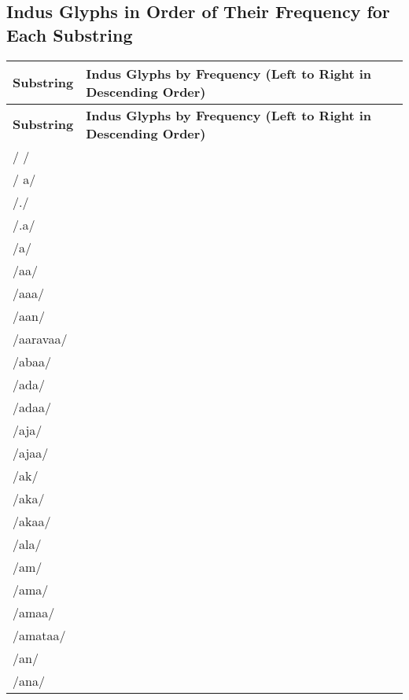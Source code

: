 \documentclass{article}
\begin{document}
\begin{center}
\section*{Indus Glyphs in Order of Their Frequency for Each Substring}
\end{center}
\begin{longtable}{|l|p{}|}
\hline
\textbf{Substring} & \textbf{Indus Glyphs by Frequency (Left to Right in Descending Order)} \\
\hline
\endfirsthead
\hline
\textbf{Substring} & \textbf{Indus Glyphs by Frequency (Left to Right in Descending Order)} \\
\hline
\endhead
\hline
\endfoot
\hline
\endlastfoot
/ / & \textIndus{} \\ \hline
/ a/ & \textIndus{} \\ \hline
/./ & \textIndus{} \\ \hline
/.a/ & \textIndus{} \\ \hline
/a/ & \textIndus{} \\ \hline
/aa/ & \textIndus{} \\ \hline
/aaa/ & \textIndus{} \\ \hline
/aan/ & \textIndus{} \\ \hline
/aaravaa/ & \textIndus{} \\ \hline
/abaa/ & \textIndus{} \\ \hline
/ada/ & \textIndus{} \\ \hline
/adaa/ & \textIndus{} \\ \hline
/aja/ & \textIndus{} \\ \hline
/ajaa/ & \textIndus{} \\ \hline
/ak/ & \textIndus{} \\ \hline
/aka/ & \textIndus{} \\ \hline
/akaa/ & \textIndus{} \\ \hline
/ala/ & \textIndus{} \\ \hline
/am/ & \textIndus{} \\ \hline
/ama/ & \textIndus{} \\ \hline
/amaa/ & \textIndus{} \\ \hline
/amataa/ & \textIndus{} \\ \hline
/an/ & \textIndus{} \\ \hline
/ana/ & \textIndus{} \\ \hline

\end{longtable}
\end{document}
